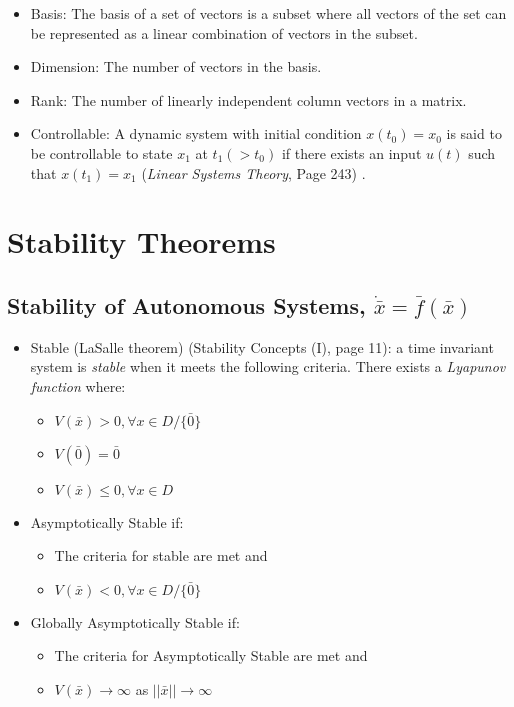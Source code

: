\documentclass[12pt]{article}
\begin{document}
\begin{itemize}
\item Basis: The basis of a set of vectors is a subset where all vectors of the set can be represented as a linear combination of vectors in the subset. 

\item Dimension: The number of vectors in the basis.

\item Rank: The number of linearly independent column vectors in a matrix.

\item Controllable: A dynamic system with initial condition $x(t_0)=x_0$ is said to be controllable to state $x_1$ at $t_1(>t_0)$ if there exists an input $u(t)$ such that $x(t_1)=x_1$ ({\em Linear Systems Theory}, Page 243)  . 

\end{itemize}


\newpage
\section*{Stability Theorems}
\subsection*{Stability of Autonomous Systems, $\dot{\bar{x}}=\bar{f}(\bar{x})$}
\begin{itemize}
\item Stable (LaSalle theorem) (Stability Concepts (I), page 11): a time invariant system is {\em stable} when it meets the following criteria. There exists a {\em Lyapunov function} where:
	\begin{itemize}
	\item $V(\bar{x})>0, \forall x \in D/\{\bar{0}\}$
	\item $V(\bar{0})=\bar{0}$
	\item $V(\bar{x})\leq0, \forall x \in D$
	\end{itemize}
\item Asymptotically Stable if:
	\begin{itemize}
	\item The criteria for stable are met and
	\item $V(\bar{x})<0, \forall x \in D/\{\bar{0}\}$
	\end{itemize}
\item Globally Asymptotically Stable if:
	\begin{itemize}
	\item The criteria for Asymptotically Stable are met and
	\item $V(\bar{x})\to\infty$ as $||\bar{x}||\to\infty$
	\end{itemize}
\end{itemize}
\end{document}
